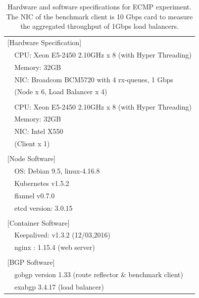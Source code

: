{
\setlength{\tabcolsep}{1em}
\renewcommand{\arraystretch}{1.2}

\begin{table}[h]
  \centering
  \begin{tabular}{ll}
    \hline 
    \multicolumn{2}{l}{[Hardware Specification]}   \\
    & CPU: Xeon E5-2450 2.10GHz x 8 (with Hyper Threading) \\
    & Memory: 32GB \\
    & NIC: Broadcom BCM5720 with 4 rx-queues, 1 Gbps \\
    & (Node x 6, Load Balancer x 4) \\
    & \\
    & CPU: Xeon E5-2450 2.10GHz x 8 (with Hyper Threading) \\
    & Memory: 32GB \\
    & NIC: Intel X550 \\
    & (Client x 1) \\
    & \\
    \multicolumn{2}{l}{[Node Software]}  \\
    & OS: Debian 9.5, linux-4.16.8 \\
    & Kubernetes v1.5.2 \\
    & flannel v0.7.0 \\
    & etcd version: 3.0.15 \\
    & \\
    \multicolumn{2}{l}{[Container Software]}   \\
    & Keepalived: v1.3.2 (12/03,2016) \\
    & nginx : 1.15.4 (web server) \\
    & \\
    \multicolumn{2}{l}{[BGP Software]}   \\
    & gobgp version 1.33 (route reflector \& benchmark client) \\
    & exabgp 3.4.17 (load balancer) \\
  \hline 
  \end{tabular}
  \par\bigskip
  \centering
  \begin{minipage}{0.9\columnwidth}
    \caption[Hardware and software specifications for ECMP experiment]{
      Hardware and software specifications for ECMP experiment.
      The NIC of the benchmark client is 10 Gbps card to measure the aggregated throughput of 1Gbps load balancers.
    }
    \label{tab:ecmp-hw_sw_spec}
  \end{minipage}
\end{table}
}

